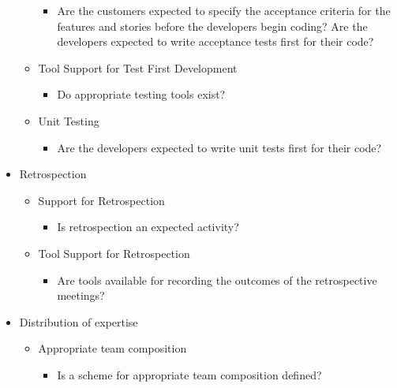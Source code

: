 \begin{appendices}
\begin{itemize}
\begin{itemize}
\begin{itemize}
					\item Are the customers expected to specify the acceptance criteria for the features and stories before the developers begin coding?
					\addition Are the developers expected to write acceptance tests first for their code?
				\end{itemize}
		\end{itemize} 
		\begin{itemize}
			\item Tool Support for Test First Development
				\begin{itemize}
					\item Do appropriate testing tools exist?
				\end{itemize}
		\end{itemize}
		\begin{itemize}
			\item Unit Testing
				\begin{itemize}
					\item Are the developers expected to write unit tests first for their code?
				\end{itemize}
		\end{itemize}
	\item Retrospection
		\begin{itemize}
			\item Support for Retrospection
				\begin{itemize}
					\item Is retrospection an expected activity?
				\end{itemize}
		\end{itemize}
		\begin{itemize}
			\item Tool Support for Retrospection
				\begin{itemize}
					\item Are tools available for recording the outcomes of the retrospective meetings?
				\end{itemize}
		\end{itemize}
	\item Distribution of expertise
		\begin{itemize}
			\item Appropriate team composition
				\begin{itemize}
					\item Is a scheme for appropriate team composition defined?

\end{itemize}
\end{itemize}
\end{itemize}
\end{appendices}

